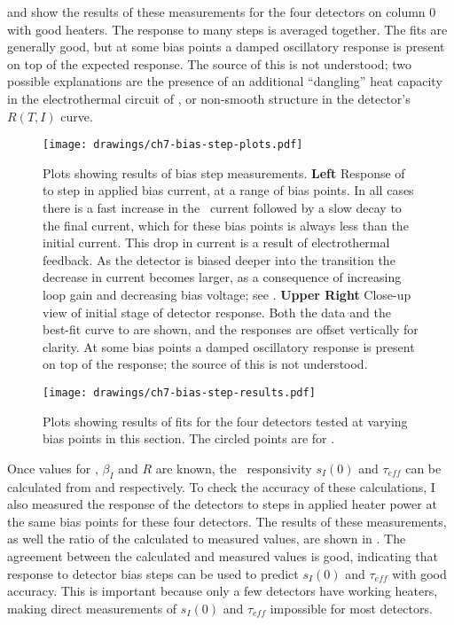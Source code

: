  and  show the results of these measurements for the four detectors on column 0 with good heaters.
The response to many steps is averaged together.
The fits are generally good, but at some bias points a damped oscillatory response is present on top of the expected  response.
The source of this is not understood; two possible explanations are the presence of an additional ``dangling'' heat capacity in the electrothermal circuit of  \cite{hoevers_thermal_2000,zink_array-compatible_2006,maasilta_complex_2012}, or non-smooth structure in the detector's $R(T,I)$ curve.

\begin{figure*}
  \centering
\texttt{[image: drawings/ch7-bias-step-plots.pdf]}
\caption{%
  Plots showing results of bias step measurements.
\textbf{Left}
Response of  to step in applied bias current, at a range of bias points.
In all cases there is a fast increase in the \TES\ current followed by a slow decay to the final current, which for these bias points is always less than the initial current.
This drop in current is a result of electrothermal feedback.
As the detector is biased deeper into the transition the decrease in current becomes larger, as a consequence of increasing loop gain and decreasing bias voltage; see .
\textbf{Upper Right}
Close-up view of initial stage of detector response.
Both the data and the best-fit curve to  are shown, and the responses are offset vertically for clarity.
At some bias points a damped oscillatory response is present on top of the  response; the source of this is not understood.
}
\label{fig:ch7-bias-step-plots}
\end{figure*}

\begin{figure*}
  \centering
\texttt{[image: drawings/ch7-bias-step-results.pdf]}
\caption{%
  Plots showing results of fits for the four detectors tested at varying bias points in this section.
  The circled points are for \SOC.
}
\label{fig:ch7-bias-step-results}
\end{figure*}

Once values for \Loop, $\beta_I$ and $R$ are known, the \DC\ responsivity $s_I(0)$ and $\tau_{eff}$ can be calculated from  and  respectively.
To check the accuracy of these calculations, I also measured the response of the detectors to steps in applied heater power at the same bias points for these four detectors.
The results of these measurements, as well the ratio of the calculated to measured values, are shown in .
The agreement between the calculated and measured values is good, indicating that response to detector bias steps can be used to predict $s_I(0)$ and $\tau_{eff}$ with good accuracy.
This is important because only a few detectors have working heaters, making direct measurements of $s_I(0)$ and $\tau_{eff}$ impossible for most detectors.

